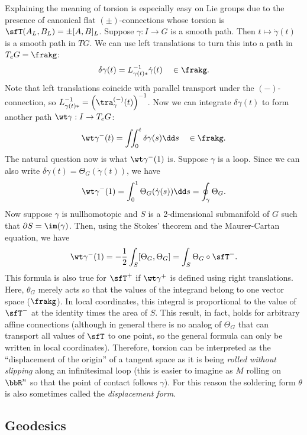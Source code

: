 \begin{example}
    Explaining the meaning of torsion is especially easy on Lie groups due to the presence of canonical flat $(\pm)$-connections whose torsion is $\sfT(A_L,B_L)=\pm [A,B]_L$. Suppose $\gamma:I\to G$ is a smooth path. Then $t\mapsto \dot\gamma(t)$ is a smooth path in $TG$. We can use left translations to turn this into a path in $T_e G=\frakg$:
    \[\delta \gamma(t)=L_{\gamma(t)\ast}^{-1}\dot\gamma(t)\quad \in \frakg.\]
    Note that left translations coincide with parallel transport under the $(-)$-connection, so $L_{\gamma(t)\ast}^{-1}=\left(\tra^{(-)}_{\gamma}(t)\right)^{-1}$. Now we can integrate $\delta\gamma(t)$ to form another path $\wt\gamma:I\to T_e G$:
    \[\wt\gamma^-(t)=\iint_0^t \delta\gamma(s)\dd s \quad \in \frakg.\]
    The natural question now is what $\wt\gamma^-(1)$ is. Suppose $\gamma$ is a loop. Since we can also write $\delta\gamma(t)=\Theta_G(\dot\gamma(t))$, we have
    \[\wt\gamma^-(1)=\int_0^1 \Theta_G(\dot\gamma(s))\dd s=\oint_\gamma \Theta_G.\]
    Now suppose $\gamma$ is nullhomotopic and $S$ is a 2-dimensional submanifold of $G$ such that $\partial S=\im(\gamma)$. Then, using the Stokes' theorem and the Maurer-Cartan equation, we have
    \[\wt\gamma^-(1)=-\frac12\int_S [\Theta_G,\Theta_G]=\int_S \Theta_G\circ \sfT^-.\]
    This formula is also true for $\sfT^+$ if $\wt\gamma^+$ is defined using right translations. Here, $\theta_G$ merely acts so that the values of the integrand belong to one vector space ($\frakg$). In local coordinates, this integral is proportional to the value of $\sfT^-$ at the identity times the area of $S$. This result, in fact, holds for arbitrary affine connections (although in general there is no analog of $\Theta_G$ that can transport all values of $\sfT$ to one point, so the general formula can only be written in local coordinates). Therefore, torsion can be interpreted as the ``displacement of the origin'' of a tangent space as it is being \emph{rolled without slipping} along an infinitesimal loop (this is easier to imagine as $M$ rolling on $\bbR^n$ so that the point of contact follows $\gamma$). For this reason the soldering form $\theta$ is also sometimes called the \emph{displacement form}.
\end{example}







\subsection{Geodesics}


